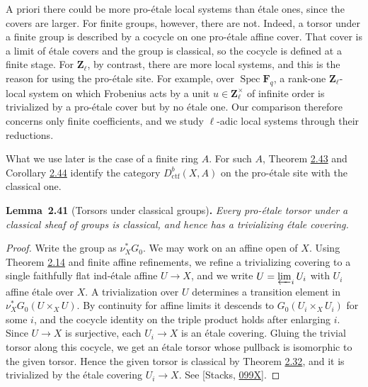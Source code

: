\documentclass[11pt]{article}
\newenvironment{bpstatement}[2]{\par\addvspace{0.6\baselineskip}\noindent\textbf{#1}#2\textbf{.}\enspace\ignorespaces}
  {\par\addvspace{0.4\baselineskip}}
\newenvironment{bpstatementit}[2]{\begin{bpstatement}{#1}{#2}\itshape\ignorespaces}{\end{bpstatement}}
\begin{document}
A priori there could be more pro-étale local systems than étale ones, since the covers are larger. For finite groups, however, there are not. Indeed, a torsor under a finite group is described by a cocycle on one pro-étale affine cover. That cover is a limit of étale covers and the group is classical, so the cocycle is defined at a finite stage. For \(\mathbf Z_\ell\), by contrast, there are more local systems, and this is the reason for using the pro-étale site. For example, over \(\operatorname{Spec}\mathbf F_q\), a rank-one \(\mathbf Z_\ell\)-local system on which Frobenius acts by a unit \(u\in\mathbf Z_\ell^\times\) of infinite order is trivialized by a pro-étale cover but by no étale one. Our comparison therefore concerns only finite coefficients, and we study \(\ell\)-adic local systems through their reductions.

What we use later is the case of a finite ring \(A\). For such \(A\), Theorem \hyperref[bp127]{2.43} and Corollary \hyperref[bp130]{2.44} identify the category \(D^b_{\mathrm{ctf}}(X,A)\) on the pro-étale site with the classical one.

\label{bp121}%
\begin{bpstatementit}{Lemma~2.41}{ (Torsors under classical groups)}
Every pro-étale torsor under a classical sheaf of groups is classical, and hence has a trivializing étale covering.
\end{bpstatementit}

\begin{proof}[{Proof}]\label{bp122}%
Write the group as \(\nu_X^*G_0\). We may work on an affine open of \(X\). Using Theorem \hyperref[bp40]{2.14} and finite affine refinements, we refine a trivializing covering to a single faithfully flat ind-étale affine \(U\to X\), and we write \(U=\varprojlim_iU_i\) with \(U_i\) affine étale over \(X\). A trivialization over \(U\) determines a transition element in \(\nu_X^*G_0(U\times_XU)\). By continuity for affine limits it descends to \(G_0(U_i\times_XU_i)\) for some \(i\), and the cocycle identity on the triple product holds after enlarging \(i\). Since \(U\to X\) is surjective, each \(U_i\to X\) is an étale covering. Gluing the trivial torsor along this cocycle, we get an étale torsor whose pullback is isomorphic to the given torsor. Hence the given torsor is classical by Theorem \hyperref[bp93]{2.32}, and it is trivialized by the étale covering \(U_i\to X\). See [Stacks, \href{https://stacks.math.columbia.edu/tag/099X}{099X}].
\end{proof}
\end{document}
